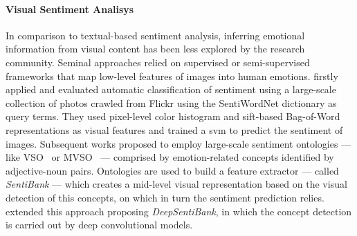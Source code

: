 \paragraph{Visual Sentiment Analisys}
In comparison to textual-based sentiment analysis, inferring emotional information from visual content has been less explored by the research community.
Seminal approaches \cite{machajdik2010affective,siersdorfer2010analyzing,jia2012can} relied on supervised or semi-supervised frameworks that map low-level features of images into human emotions.
\citet{siersdorfer2010analyzing} firstly applied and evaluated automatic classification of sentiment using a large-scale collection of photos crawled from Flickr using the SentiWordNet \cite{esuli2007sentiwordnet} dictionary as query terms.
They used pixel-level color histogram and \gls{sift}-based Bag-of-Word representations as visual features and trained a \gls{svm} to predict the sentiment of images.
Subsequent works \cite{borth2013large,yuan2013sentribute,jou2015visual} proposed to employ large-scale sentiment ontologies --- like VSO~\cite{borth2013large} or MVSO~\cite{jou2015visual} --- comprised by emotion-related concepts identified by adjective-noun pairs.
Ontologies are used to build a feature extractor --- called \emph{SentiBank} --- which creates a mid-level visual representation based on the visual detection of this concepts, on which in turn the sentiment prediction relies.
\citet{chen2014deepsentibank} extended this approach proposing \emph{DeepSentiBank}, in which the concept detection is carried out by deep convolutional models.
